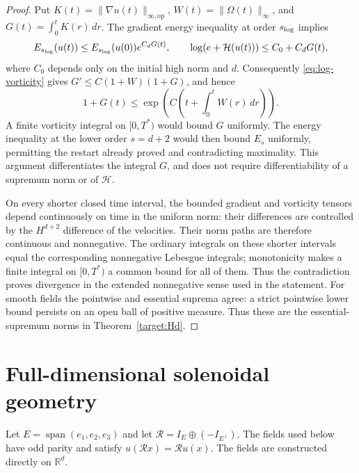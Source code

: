 \documentclass[11pt]{article}
\newcommand{\R}{\mathbb R}
\theoremstyle{definition}
\begin{document}
\begin{proof}
Put $K(t)=\|\nabla u(t)\|_{\infty,\mathrm{op}}$,
$W(t)=\|\Omega(t)\|_\infty$, and $G(t)=\int_0^tK(r)\,dr$.
The gradient energy inequality at order $s_{\rm log}$ implies
\[
 E_{s_{\rm log}}(u(t))\leq E_{s_{\rm log}}(u(0))e^{C_dG(t)},
 \qquad \log(e+\mathcal H(u(t)))\leq C_0+C_dG(t),
\]
where $C_0$ depends only on the initial high norm and $d$.
Consequently \eqref{eq:log-vorticity} gives
$G'\leq C(1+W)(1+G)$, and hence
\[
 1+G(t)\leq\exp\!\left(C\left(t+\int_0^tW(r)\,dr\right)\right).
\]
A finite vorticity integral on $[0,T^*)$ would bound $G$ uniformly.
The energy inequality at the lower order $s=d+2$ would then bound
$E_s$ uniformly, permitting the restart already proved and contradicting
maximality. This argument differentiates the integral $G$, and does not
require differentiability of a supremum norm or of $\mathcal H$.

On every shorter closed time interval, the bounded gradient and vorticity
tensors depend continuously on time in the uniform norm: their differences
are controlled by the $H^{d+2}$ difference of the velocities. Their norm
paths are therefore continuous and nonnegative. The ordinary integrals
on these shorter intervals equal the corresponding nonnegative Lebesgue
integrals; monotonicity makes a finite integral on $[0,T^*)$ a common
bound for all of them. Thus the contradiction proves divergence in the
extended nonnegative sense used in the statement.
For smooth fields the pointwise and essential suprema agree: a strict
pointwise lower bound persists on an open ball of positive measure.
Thus these are the essential-supremum norms in Theorem~\ref{target:Hd}.
\end{proof}

\section{Full-dimensional solenoidal geometry}
Let $E=\operatorname{span}(e_1,e_2,e_3)$ and let
$\mathcal R=I_E\oplus(-I_{E^\perp})$. The fields used below have odd
parity and satisfy $u(\mathcal R x)=\mathcal R u(x)$.
The fields are constructed directly on $\R^d$.
\end{document}
